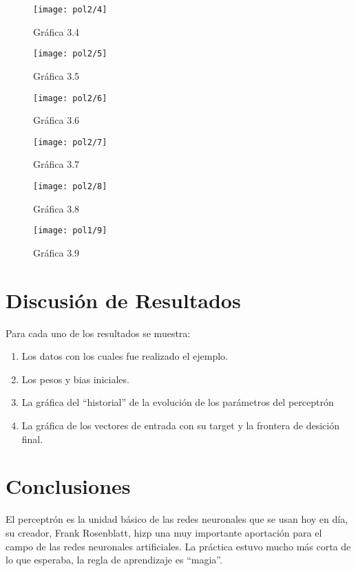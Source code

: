 \documentclass[6pt]{article}
\begin{document}
\begin{figure}[htpb]
	\centering
	\texttt{[image: pol2/4]}
	\caption{Gráfica 3.4}
\end{figure}

\begin{figure}[htpb]
	\centering
	\texttt{[image: pol2/5]}
	\caption{Gráfica 3.5}
\end{figure}

\begin{figure}[htpb]
	\centering
	\texttt{[image: pol2/6]}
	\caption{Gráfica 3.6}
\end{figure}

\begin{figure}[htpb]
	\centering
	\texttt{[image: pol2/7]}
	\caption{Gráfica 3.7}
\end{figure}

\begin{figure}[htpb]
	\centering
	\texttt{[image: pol2/8]}
	\caption{Gráfica 3.8}
\end{figure}

\begin{figure}[htpb]
	\centering
	\texttt{[image: pol1/9]}
	\caption{Gráfica 3.9}
\end{figure}
\newpage
\section{Discusión de Resultados}
Para cada uno de los resultados se muestra:
\begin{enumerate}
	\item Los datos con los cuales fue realizado el ejemplo.
	\item Los pesos y bias iniciales.
	\item La gráfica del ``historial'' de la evolución de los parámetros del perceptrón
	\item La gráfica de los vectores de entrada con su target y la frontera de desición final.
\end{enumerate}
\section{Conclusiones}
El perceptrón es la unidad básico de las redes neuronales que se usan hoy en día, su creador,  Frank Rosenblatt,  hizp una muy importante aportación para el campo de las redes neuronales artificiales. 
La práctica estuvo mucho más corta de lo que esperaba, la regla de aprendizaje es ``magia''. 
\end{document}

